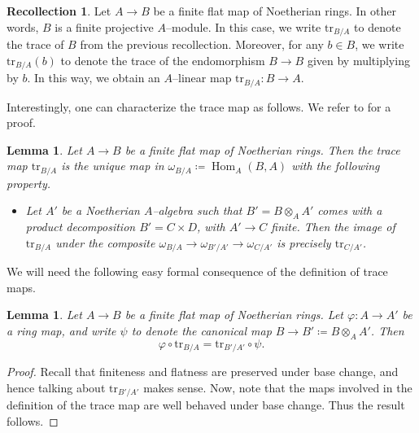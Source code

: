 \documentclass{article}
\theoremstyle{plain}
\newtheorem{Lemma}[Th]{Lemma}
\theoremstyle{definition}
\newtheorem{Rec}[Th]{Recollection}
\DeclareMathOperator{\Hom}{Hom}
\begin{document}
\begin{Rec}\label{rec-def-trace}
    Let $A\to B$ be a finite flat map of Noetherian rings. In other words, $B$ is a finite projective  $A$--module. In this case, we write   $\mathrm{tr}_{B/A}$ to denote the trace of $B$ from the previous recollection. Moreover, for any $b\in B$, we write $\mathrm{tr}_{B/A}(b)$ to denote the trace of the endomorphism $B\to B$ given by multiplying by $b$. In this way, we obtain an $A$--linear map $\mathrm{tr}_{B/A}\colon B\to A$. 
\end{Rec}

Interestingly, one can characterize the trace map as follows. We refer to \cite[Tag 0BSY]{stacks-project} for a proof. 

\begin{Lemma}\label{lemma-trace-universalprop}
    Let $A\to B$ be a finite flat map of Noetherian rings. Then the trace map $\mathrm{tr}_{B/A}$ is the unique map in $\omega_{B/A}\coloneqq\Hom_A(B,A)$ with the following  property. 
    \begin{itemize}
        \item[($\star$)] Let $A'$ be a Noetherian $A$--algebra such that $B'=B\otimes_AA'$   comes with a product decomposition $B'=C\times D$, with $A'\to C$ finite. Then the image of $\mathrm{tr}_{B/A}$ under the composite $\omega_{B/A} \to \omega_{B'/A'}\to \omega_{C/A'}$ is precisely $\mathrm{tr}_{C/A'}$.      
    \end{itemize}
\end{Lemma}

We will need the following easy formal consequence of the definition of trace maps.  

\begin{Lemma}\label{lemma-basechange-trace}
      Let $A\to B$ be a finite flat map of Noetherian rings. Let $\varphi\colon A\to A' $ be a ring map, and write $\psi$ to denote the canonical map $B\to B'\coloneqq B\otimes_AA'$. Then 
      \begin{equation}\label{eq-trace}
          \varphi\circ \mathrm{tr}_{B/A} =\mathrm{tr}_{B'/A'}\circ \psi.
      \end{equation}
\end{Lemma}

\begin{proof}
   Recall that finiteness and flatness are preserved under base change, and hence talking about  $\mathrm{tr}_{B'/A'}$ makes sense. Now, note that the maps involved in the definition of the trace map are well behaved under base change. Thus the result follows. 
\end{proof}
\end{document}
